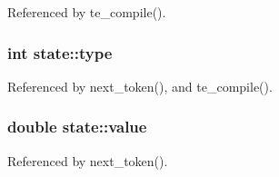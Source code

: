 Referenced by te\+\_\+compile().

\subsubsection[{type}]{\setlength{\rightskip}{0pt plus 5cm}int state\+::type}\label{structstate_a8f960cbbf1b94dee7dc6cf2fe3b5c4c4}


Referenced by next\+\_\+token(), and te\+\_\+compile().

\subsubsection[{value}]{\setlength{\rightskip}{0pt plus 5cm}double state\+::value}\label{structstate_ab328833625ef4e6680e95aa57cd12f0a}


Referenced by next\+\_\+token().

